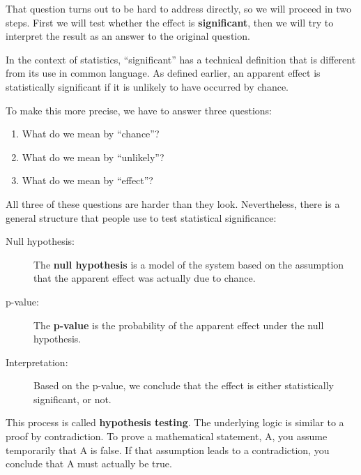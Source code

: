 \documentclass[12pt]{book}
\begin{document}

That question turns out to be hard to address directly, so we will
proceed in two steps.  First we will test whether the effect is {\bf
  significant}, then we will try to interpret the result
  as an answer to the original question.


In the context of statistics, ``significant'' has a technical
definition that is different from its use in common language.
As defined earlier, an apparent effect is statistically
significant if it is unlikely to have occurred by chance.


To make this more precise, we have to answer three questions:

\begin{enumerate}

\item What do we mean by ``chance''?

\item What do we mean by ``unlikely''?

\item What do we mean by ``effect''?

\end{enumerate}

All three of these questions are harder than they look.  Nevertheless,
there is a general structure that people use to test statistical
significance:

\begin{description}

\item[Null hypothesis:] The {\bf null hypothesis} is a model of the
  system based on the assumption that the apparent effect was actually
  due to chance.


\item[p-value:] The {\bf p-value} is the probability of the apparent
  effect under the null hypothesis.


\item[Interpretation:] Based on the p-value, we conclude that the
  effect is either statistically significant, or not.

\end{description}

This process is called {\bf hypothesis testing}.  The underlying
logic is similar to a proof by contradiction.  To prove a mathematical
statement, A, you assume temporarily that A is false.  If that
assumption leads to a contradiction, you conclude that A must actually
be true.
\end{document}
